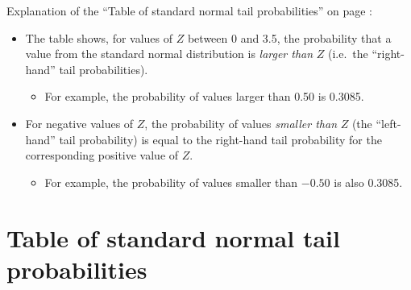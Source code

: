 \vspace*{3ex}

Explanation of the ``Table of standard normal tail probabilities'' on
page \pageref{s_disttables_Z}:
\begin{itemize}
\item
The table shows, for values of $Z$ between 0 and 3.5, the probability
that a value from the standard normal distribution is \emph{larger than}
$Z$ (i.e.\ the ``right-hand'' tail probabilities).
\begin{itemize}
\item
For example, the probability of values larger than 0.50 is 0.3085.
\end{itemize}
\item
For negative values of $Z$, the probability of values \emph{smaller
than} $Z$ (the ``left-hand'' tail probability) is equal to the right-hand
tail probability for the corresponding positive value of $Z$.
\begin{itemize}
\item
For example, the probability of values smaller than $-0.50$ is also 0.3085.
\end{itemize}
\end{itemize}


\newpage
\section{Table of standard normal tail probabilities}
\label{s_disttables_Z}

